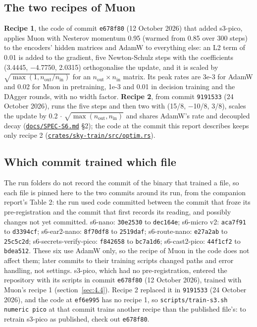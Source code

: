 \documentclass[10pt]{article}
\begin{document}
\subsection{The two recipes of Muon}\label{sec:A.4}

\textbf{Recipe 1}, the code of commit \texttt{e678f80} (12 October 2026) that added s3-pico, applies Muon with Nesterov momentum 0.95 (warmed from 0.85 over 300 steps) to the encoders' hidden matrices and AdamW to everything else: an L2 term of 0.01 is added to the gradient, five Newton-Schulz steps with the coefficients (3.4445, $-$4.7750, 2.0315) orthogonalise the update, and it is scaled by $\sqrt{\max(1, n_{\mathrm{out}} / n_{\mathrm{in}})}$ for an $n_{\mathrm{out}} \times n_{\mathrm{in}}$ matrix. Its peak rates are 3e-3 for AdamW and 0.02 for Muon in pretraining, 1e-3 and 0.01 in decision training and the DAgger rounds, with no width factor. \textbf{Recipe 2}, from commit \texttt{9191533} (24 October 2026), runs the five steps and then two with (15/8, $-$10/8, 3/8), scales the update by 0.2 $\cdot$ $\sqrt{\max(n_{\mathrm{out}}, n_{\mathrm{in}})}$ and shares AdamW's rate and decoupled decay (\href{https://github.com/maxgfr/skycmd/blob/main/docs/SPEC-S6.md}{\texttt{docs/\allowbreak{}SPEC-S6.md}} §2); the code at the commit this report describes keeps only recipe 2 (\href{https://github.com/maxgfr/skycmd/blob/main/crates/sky-train/src/optim.rs}{\texttt{crates/\allowbreak{}sky-train/\allowbreak{}src/\allowbreak{}optim.rs}}).

\subsection{Which commit trained which file}\label{sec:A.5}

The run folders do not record the commit of the binary that trained a file, so each file is pinned here to the two commits around its run, from the companion report's Table 2: the run used code committed between the commit that froze its pre-registration and the commit that first records its reading, and possibly changes not yet committed. s6-nano: \texttt{30e2530} to \texttt{dec164e}; s6-micro v2: \texttt{aca7f91} to \texttt{d3394cf}; s6-ear2-nano: \texttt{8f70df8} to \texttt{2519daf}; s6-route-nano: \texttt{e27a2ab} to \texttt{25c5c2d}; s6-secrets-verify-pico: \texttt{f842658} to \texttt{bc7a1d6}; s6-cast2-pico: \texttt{44f1cf2} to \texttt{bdea512}. These six use AdamW only, so the recipe of Muon in the code does not affect them; later commits to their training scripts changed paths and error handling, not settings. s3-pico, which had no pre-registration, entered the repository with its scripts in commit \texttt{e678f80} (12 October 2026), trained with Muon's recipe 1 (section~\ref{sec:4.4}). Recipe 2 replaced it in \texttt{9191533} (24 October 2026), and the code at \texttt{ef6e995} has no recipe 1, so \texttt{scripts/\allowbreak{}train-s3.sh numeric pico} at that commit trains another recipe than the published file's: to retrain s3-pico as published, check out \texttt{e678f80}.
\end{document}
